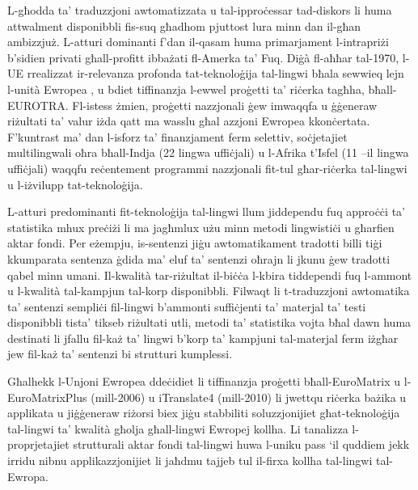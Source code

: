 \documentclass[]{../../metanetpaper}
\begin{document}
\begin{multicols}{2}

L-għodda ta’ traduzzjoni awtomatizzata u tal-ipproċessar tad-diskors li huma attwalment disponibbli fis-suq għadhom pjuttost lura minn dan il-għan ambizzjuż. L-atturi dominanti f’dan il-qasam huma primarjament l-intrapriżi b’sidien privati għall-profitt ibbażati fl-Amerka ta’ Fuq. Diġà fl-aħħar tal-1970, l-UE rrealizzat ir-relevanza profonda tat-teknoloġija tal-lingwi bħala sewwieq lejn l-unità Ewropea , u bdiet tiffinanzja l-ewwel proġetti ta’ riċerka tagħha, bħall-EUROTRA. Fl-istess żmien, proġetti nazzjonali ġew imwaqqfa u ġġeneraw riżultati ta’ valur iżda qatt ma wasslu għal azzjoni Ewropea kkonċertata. F’kuntrast ma’ dan l-isforz ta’ finanzjament ferm selettiv, soċjetajiet multilingwali oħra bħall-Indja (22 lingwa uffiċjali) u l-Afrika t’Isfel (11 –il lingwa uffiċjali) waqqfu reċentement programmi nazzjonali fit-tul għar-riċerka tal-lingwi u l-iżvilupp tat-teknoloġija.
   
L-atturi predominanti fit-teknoloġija tal-lingwi llum jiddependu fuq  approċċi ta’ statistika mhux preċiżi li ma jagħmlux użu minn metodi lingwistiċi u għarfien aktar fondi. Per eżempju, is-sentenzi jiġu awtomatikament tradotti billi tiġi kkumparata sentenza ġdida ma’ eluf ta’ sentenzi oħrajn li jkunu ġew tradotti qabel minn umani. Il-kwalità tar-riżultat il-biċċa l-kbira tiddependi fuq l-ammont u l-kwalità tal-kampjun tal-korp disponibbli. Filwaqt li t-traduzzjoni awtomatika ta’ sentenzi sempliċi fil-lingwi b’ammonti suffiċjenti ta’ materjal ta’ testi disponibbli tista’ tikseb riżultati utli, metodi ta’ statistika vojta bħal dawn huma destinati li jfallu fil-każ ta’ lingwi b’korp ta’ kampjuni tal-materjal ferm iżgħar jew fil-każ ta’ sentenzi bi strutturi kumplessi. 
   
Għalhekk l-Unjoni Ewropea ddeċidiet li tiffinanzja proġetti bħall-EuroMatrix u l-EuroMatrixPlus (mill-2006) u iTranslate4 (mill-2010) li jwettqu riċerka bażika u applikata u jiġġeneraw riżorsi biex jiġu stabbiliti soluzzjonijiet għat-teknoloġija tal-lingwi ta’ kwalità għolja għall-lingwi Ewropej kollha. Li tanalizza l-proprjetajiet strutturali aktar fondi tal-lingwi huwa l-uniku pass ‘il quddiem jekk irridu nibnu applikazzjonijiet li jaħdmu tajjeb tul il-firxa kollha tal-lingwi tal-Ewropa.
   

\end{multicols}
\end{document}
